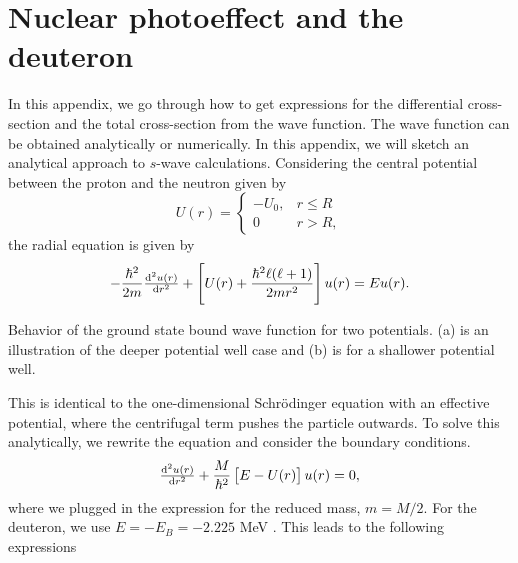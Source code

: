 \appendix

\chapter{Nuclear photoeffect and the deuteron}\label{app:deuteron}
In this appendix, we go through how to get expressions for the differential cross-section and the total cross-section from the wave function. The wave function can be obtained analytically or numerically. In this appendix, we will sketch an analytical approach to $s$-wave calculations. 
Considering the central potential between the proton and the neutron given by
\[ U(r)= \begin{cases}
	-U_0, & r \leq R \\
	0 & r > R,
\end{cases}
\]
the radial equation is given by
\begin{equation}
	-\frac{\hbar^2}{2m} \od[2]{u(r)}{r}+\left[U(r)+\frac{\hbar^2 \ell(\ell+1)}{2mr^2} \right]u(r)=Eu(r).
\end{equation}
\begin{marginfigure}
	\centering
	
	\caption{Behavior of the ground state bound wave function for two potentials. (a) is an illustration of the deeper potential well case and (b) is for a shallower potential well. }
\end{marginfigure}
This is identical to the one-dimensional Schrödinger equation with an effective potential, where the centrifugal term pushes the particle outwards. To solve this analytically, we rewrite the equation and consider the boundary conditions.
\begin{equation} \label{SEnew}
	\od[2]{u(r)}{r}+\frac{M}{\hbar^2} \left[E-U(r) \right]u(r)=0,
\end{equation}
where we plugged in the expression for the reduced mass, $m=M/2$. For the deuteron, we use $E=-E_B = -2.225$ MeV \cite{KerneII}. This leads to the following expressions

